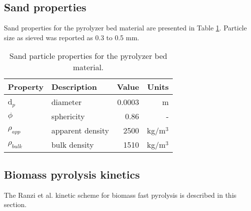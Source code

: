 \subsection{Sand properties}

Sand properties for the pyrolyzer bed material are presented in Table \ref{tab:sand-properties}. Particle size as sieved was reported as 0.3 to 0.5 mm.

\begin{table}[H]
    \centering
    \caption{Sand particle properties for the pyrolyzer bed material.}
    \label{tab:sand-properties}
    \begin{tabular}{llrr}
        \toprule
        Property & Description & Value & Units \\
        \midrule
        d$_p$ & diameter & 0.0003 & m \\
        $\phi$ & sphericity & 0.86 & - \\
        $\rho_{app}$ & apparent density & 2500 & kg/m$^3$ \\
        $\rho_{bulk}$ & bulk density & 1510 & kg/m$^3$ \\
        \bottomrule
    \end{tabular}
\end{table}

\subsection{Biomass pyrolysis kinetics}

The Ranzi et al. kinetic scheme for biomass fast pyrolysis is described in this section.

